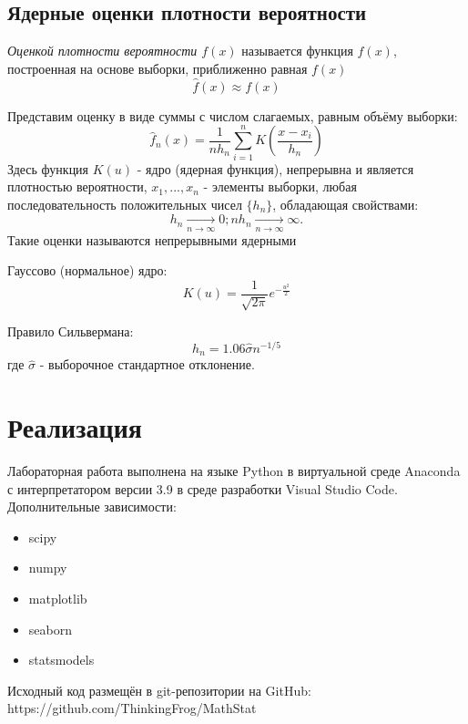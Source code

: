 \documentclass[12pt,a4paper]{article}
\begin{document}
\subsection{Ядерные оценки плотности вероятности}
\textit{Оценкой плотности вероятности $f(x)$} называется функция $\widehat{f}(x)$, построенная на основе выборки, приближенно равная $f(x)$
\begin{equation}
\widehat{f}(x)\approx f(x)
\end{equation}

Представим оценку в виде суммы с числом слагаемых, равным объёму выборки:
\begin{equation}
    \widehat{f}_n(x)=\frac{1}{n h_n}\sum_{i=1}^n{K(\frac{x-x_i}{h_n})}
\end{equation}
Здесь функция $K(u)$ - ядро (ядерная функция), непрерывна и является плотностью вероятности, $x_1,...,x_n$ - элементы выборки, любая последовательность положительных чисел $\{h_n\}$, обладающая свойствами:
\begin{equation}
    h_n\xrightarrow[n\to\infty]{}0;
    n h_n\xrightarrow[n\to\infty]{}\infty.
\end{equation}
Такие оценки называются непрерывными ядерными

Гауссово (нормальное) ядро:
\begin{equation}
    K(u)=\frac{1}{\sqrt{2\pi}}e^{-\frac{u^2}{2}}
\end{equation}

Правило Сильвермана:
\begin{equation}
    h_n=1.06\hat{\sigma}n^{-1/5}
\end{equation}
где $\hat{\sigma}$ - выборочное стандартное отклонение.

\section{Реализация}
Лабораторная работа выполнена на языке Python в виртуальной среде Anaconda с интерпретатором версии 3.9 в среде разработки Visual Studio Code. Дополнительные зависимости:
\begin{itemize}
    \item scipy
    \item numpy
    \item matplotlib
    \item seaborn
    \item statsmodels
\end{itemize}

Исходный код размещён в git-репозитории на GitHub: \\ https://github.com/ThinkingFrog/MathStat
\end{document}
